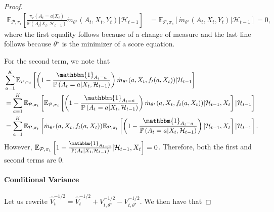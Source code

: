 \documentclass[11pt]{article}
\newcommand{\E}{\mathbb{E}}
\begin{document}
\begin{appendix}
\begin{proof}
\begin{align*}\E_{\mathcal{P},\pi_{t}}\left[\frac{  \pi_{e}(A_{t} =a | X_{t})}{\mathbb{P} \left(A_{t}| X_{t}, \mathcal{H}_{t-1}\right) } \dot{m}_{\theta^{\star}}(A_{t},X_{t},Y_{t}) | \mathcal{H}_{t-1}\right] 
&=\E_{\mathcal{P},\pi_{e}}\left[ \dot{m}_{\theta^{\star}}(A_{t},X_{t},Y_{t}) | \mathcal{H}_{t-1}\right] = 0,
\end{align*}
where the first equality follows because of a change of measure and the last line follows because $\theta^{\star}$ is the minimizer of a score equation. 

For the second term, we note that 
\begin{align*}
     &\sum_{a =1}^{K} \E_{\mathcal{P},\pi_{t}} \left[ 
    \left( 1 - \frac{ \mathbbm{1}_{A_t=a}  }{\mathbb{P} \left(A_{t}=a | X_{t} , \mathcal{H}_{t-1}  \right) } \right)\dot{m}_{\theta^{\star}}(a,X_{t},f_{t}(a,X_{t}))  | \mathcal{H}_{t-1}\right]  \\ &= \sum_{a =1}^{K} \E_{\mathcal{P},\pi_{t}} \left[ \E_{\mathcal{P},\pi_{t}} \left[ 
    \left( 1 - \frac{\mathbbm{1}_{A_t=a}  }{\mathbb{P} \left(A_{t}=a | X_{t} , \mathcal{H}_{t-1}  \right)  } \right)\dot{m}_{\theta^{\star}}(a,X_{t},f_{t}(a,X_{t}))  | \mathcal{H}_{t-1}, X_{t} \right]| \mathcal{H}_{t-1}\right] \\
    &= \sum_{a =1}^{K}\E_{\mathcal{P},\pi_{t}}\left[ \dot{m}_{\theta^{\star}}(a,X_{t},f_{t}(a,X_{t})) \E_{\mathcal{P},\pi_{t}} \left[  
    \left( 1 - \frac{ \mathbbm{1}_{A_t=a}  }{\mathbb{P} \left(A_{t}=a| X_{t}, \mathcal{H}_{t-1} \right) } \right)  | \mathcal{H}_{t-1}, X_{t} \right]| \mathcal{H}_{t-1}\right].
\end{align*}
However, $\E_{\mathcal{P},\pi_{t}} \left[  
    1 - \frac{\mathbbm{1}_{A_t=a}  }{\mathbb{P} \left(A_{t}| X_{t}, \mathcal{H}_{t-1} \right) }  | \mathcal{H}_{t-1}, X_{t} \right] = 0$.
Therefore, both the first and second terms are $0$.



\paragraph{Conditional Variance} Let us rewrite $\hat{V}_{t}^{-1/2} = \hat{V}_{t}^{-1/2}+V_{t,\theta^{\star}}^{-1/2}-V_{t,\theta^{\star}}^{-1/2} $. We then have that


\end{proof}
\end{appendix}
\end{document}
